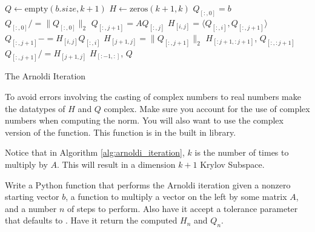\begin{algorithm}
\begin{algorithmic}[1]
	\State $Q \gets \text{empty}\left(b.size, k+1\right)$	
	\State $H \gets \text{zeros}\left( k+1, k\right)$
	\State $Q_{[:,0]} = b$							
	\State $Q_{[:,0]} /= \|Q_{[:,0]}\|_2$						
								
		\State $Q_{[:,j+1]} = AQ_{[:,j]}$		
							
			\State $H_{[i,j]} = \langle Q_{[:,i]}, Q_{[:,j+1]}\rangle$		
			\State $Q_{[:,j+1]} -= H_{[i,j]} Q_{[:,i]}$
		\EndFor
		\State $H_{[j+1,j]} = \|Q_{[:,j+1]}\|_2$			
            					
			\State {} $H_{[:j+1,:j+1]}$, $Q_{[:,:j+1]}$
		\EndIf
		\State $Q_{[:,j+1]} /= H_{[j+1,j]}$				
	\EndFor
	\State {} $H_{[:-1, :]}$, $Q$			
\EndProcedure
\end{algorithmic}
\caption{The Arnoldi Iteration}
\label{alg:arnoldi_iteration}
\end{algorithm}

\begin{warn}
To avoid errors involving the casting of complex numbers to real numbers make the datatypes of $H$ and $Q$ complex.
Make sure you account for the use of complex numbers when computing the norm.
You will also want to use the complex version of the  function.
This function is in the built in  library.
\end{warn}

Notice that in Algorithm \ref{alg:arnoldi_iteration}, $k$ is the number of times to multiply by $A$.
This will result in a dimension $k+1$ Krylov Subspace.

\begin{problem}\label{prob:arnoldi}
Write a Python function that performs the Arnoldi iteration given a nonzero starting vector $b$, a function to multiply a
vector on the left by some matrix $A$, and a number $n$ of steps to perform.
Also have it accept a tolerance parameter that defaults to .
Have it return the computed $H_n$ and $Q_n$.
\end{problem}


